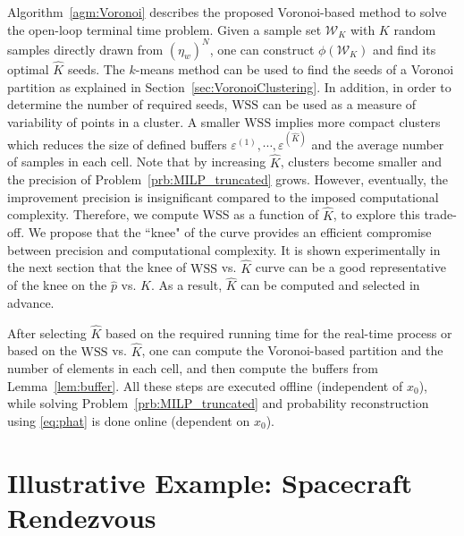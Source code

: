 \documentclass[11pt,letterpaper]{article}
\newcommand{\W}{\mathcal{W}}
\begin{document}
    Algorithm~\ref{agm:Voronoi} describes the proposed Voronoi-based method to solve the open-loop terminal time problem. Given a sample set $\W_K$ with $K$ random samples directly drawn from $(\eta_{w})^{N}$, one can construct $\phi(\W_K)$ and find its optimal $\hat{K}$ seeds. The $k$-means method can be used to find the seeds of a Voronoi partition as explained in Section~\ref{sec:VoronoiClustering}. In addition, in order to determine the number of required seeds, $\mathrm{WSS}$ can be used as a measure of variability of points in a cluster. A smaller $\mathrm{WSS}$ implies more compact clusters which reduces the size of defined buffers $\varepsilon^{(1)},\cdots,\varepsilon^{(\hat{K})}$ and the average number of samples in each cell. Note that by increasing $\hat{K}$, clusters become smaller and the precision of Problem~\ref{prb:MILP_truncated} grows. However, eventually,  the improvement precision is insignificant compared to the imposed computational complexity.  Therefore, we compute WSS as a function of $\hat{K}$, to explore this trade-off. We propose that the ``knee" of the curve provides an efficient compromise between precision and computational complexity. It is shown experimentally in the next section that the knee of $\mathrm{WSS}$ vs. $\hat{K}$ curve can be a good representative of the knee on the $\hat{p}$ vs. $\hat{K}$. As a result, $\hat{K}$ can be computed and selected in advance.  
	
    After selecting $\hat{K}$ based on the required running time for the real-time process or based on the $\mathrm{WSS}$ vs. $\hat{K}$, one can compute the Voronoi-based partition and the number of elements in each cell, and then compute the buffers from Lemma~\ref{lem:buffer}. All these steps are executed offline (independent of $ x_0$), while solving Problem~\ref{prb:MILP_truncated} and probability reconstruction using \eqref{eq:phat} is done online (dependent on $x_0$).   
	
	\section{Illustrative Example: Spacecraft Rendezvous} \label{sec:IllustrativeExample}
	
\end{document}
